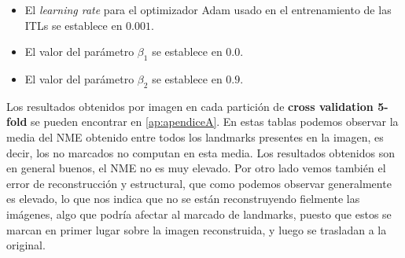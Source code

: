         \begin{itemize}
            \item El \textit{learning rate} para el optimizador Adam usado en el entrenamiento de las ITLs se establece en $0.001$. 
            \item El valor del parámetro $\beta_1$ se establece en $0.0$.
            \item El valor del parámetro $\beta_2$ se establece en $0.9$.
        \end{itemize}

        \noindent Los resultados obtenidos por imagen en cada partición de \textbf{cross validation 5-fold } se pueden encontrar en \autoref{ap:apendiceA}. En estas tablas podemos observar la media del NME obtenido entre todos los landmarks presentes en la imagen, es decir, los no marcados no computan en esta media. Los resultados obtenidos son en general buenos, el NME no es muy elevado. Por otro lado vemos también el error de reconstrucción y estructural, que como podemos observar generalmente es elevado, lo que nos indica que no se están reconstruyendo fielmente las imágenes, algo que podría afectar al marcado de landmarks, puesto que estos se marcan en primer lugar sobre la imagen reconstruida, y luego se trasladan a la original.

